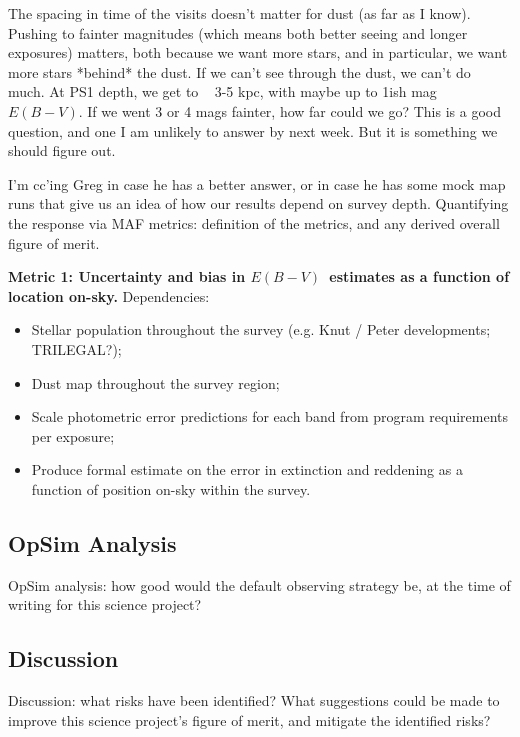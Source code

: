 The spacing in time of the visits doesn't matter for dust (as far as I know). 
Pushing to fainter magnitudes (which means both better seeing and longer exposures) matters, both because we want more stars, and in particular, we want more stars *behind* the dust.  If we can't see through the dust, we can't do much.  At PS1 depth, we get to ~ 3-5 kpc, with maybe up to 1ish mag $E(B-V)$.  If we went 3 or 4 mags fainter, how far could we go?  This is a good question, and one I am unlikely to answer by next week.  But it is something we should figure out. 

I'm cc'ing Greg in case he has a better answer, or in case he has some mock map runs that give us an idea of how our results depend on survey depth. 
Quantifying the response via MAF metrics: definition of the metrics,
and any derived overall figure of merit.

{\bf Metric 1: Uncertainty and bias in $E(B-V)$~estimates as a
  function of location on-sky.} Dependencies:

\begin{itemize}
  \item Stellar population throughout the survey (e.g. Knut / Peter developments; TRILEGAL?);
    \item Dust map throughout the survey region;
    \item Scale photometric error predictions for each band from program requirements per exposure;
      \item Produce formal estimate on the error in extinction and reddening as a function of position on-sky within the survey.
\end{itemize}



\subsection{OpSim Analysis}
\label{sec:\secname:analysis}

OpSim analysis: how good would the default observing strategy be, at
the time of writing for this science project?



\subsection{Discussion}
\label{sec:\secname:discussion}

Discussion: what risks have been identified? What suggestions could be
made to improve this science project's figure of merit, and mitigate
the identified risks?



\navigationbar
